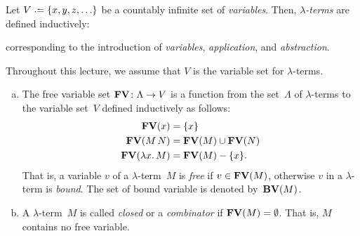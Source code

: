 \begin{definition}[Syntax]
  Let $V \defeq \{ x, y, z, \ldots \}$ be a countably infinite set of
  \emph{variables}.  Then, \emph{$\lambda$-terms} are defined inductively:
  \begin{multicols}{3}
    \begin{prooftree}
    \end{prooftree}
    \columnbreak
    \begin{prooftree}
    \end{prooftree}
    \columnbreak
    \begin{prooftree}
    \end{prooftree}
  \end{multicols}
  \noindent corresponding to the introduction of \emph{variables},
  \emph{application}, and \emph{abstraction}.
\end{definition}
Throughout this lecture, we assume that $V$ is the variable set for
$\lambda$-terms. 
\begin{definition}
  \begin{enumerate}[(a)]
    \item The free variable set $\FV\colon \Lambda \to V$ is a function from the
      set~$\Lambda$ of $\lambda$-terms to the variable set~$V$ defined
      inductively as follows:
      \begin{align*}
        \FV(x) & = \{ x \} \\
        \FV(M\, N) & = \FV(M) \cup \FV(N) \\
        \FV(\lambda x.\, M) & = \FV(M) - \{ x \}.
      \end{align*}
      That is, a variable $v$ of a $\lambda$-term~$M$ is \emph{free} if $v \in
      \FV(M)$, otherwise $v$ in a $\lambda$-term is
      \emph{bound}. The set of bound variable is denoted by~$\BV(M)$.
    \item A $\lambda$-term~$M$ is called \emph{closed} or a \emph{combinator} if
      $\FV(M) = \emptyset$. That
      is, $M$ contains no free variable.
  \end{enumerate}
\end{definition}

